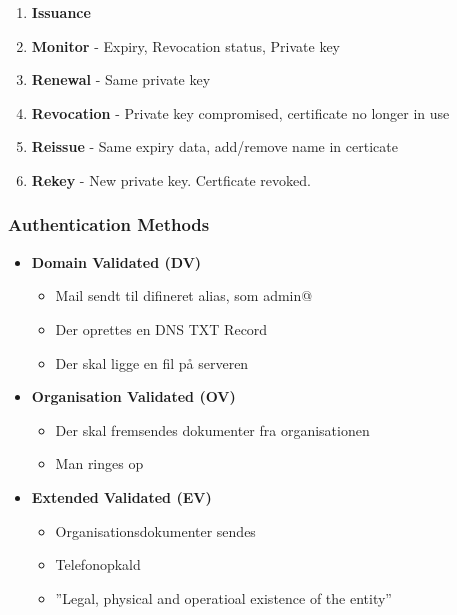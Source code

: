 \begin{enumerate}
	\item \textbf{Issuance}
	\item \textbf{Monitor} - Expiry, Revocation status, Private key
	\item \textbf{Renewal} - Same private key
	\item \textbf{Revocation} - Private key compromised, certificate no longer in use
	\item \textbf{Reissue} - Same expiry data, add/remove name in certicate
	\item \textbf{Rekey} - New private key. Certficate revoked.
\end{enumerate}

\subsubsection{Authentication Methods}

\begin{itemize}
	\item \textbf{Domain Validated (DV)}
	\begin{itemize}
		\item Mail sendt til difineret alias, som admin@
		\item Der oprettes en DNS TXT Record
		\item Der skal ligge en fil på serveren
	\end{itemize}
	\item \textbf{Organisation Validated (OV)}
	\begin{itemize}
		\item Der skal fremsendes dokumenter fra organisationen
		\item Man ringes op
	\end{itemize}
	\item \textbf{Extended Validated (EV)}
	\begin{itemize}
		\item Organisationsdokumenter sendes
		\item Telefonopkald
		\item ''Legal, physical and operatioal existence of the entity''
	\end{itemize}
\end{itemize}
